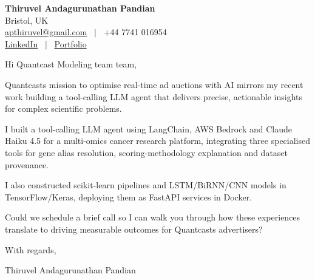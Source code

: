 \documentclass[11pt,a4paper]{article}
\begin{document}
\raggedright
\pagestyle{empty}

\begin{center}
    {\LARGE \color{linkblue} \textbf{Thiruvel Andagurunathan Pandian}}\\[0.2cm]
    Bristol, UK \\
    \href{mailto:apthiruvel@gmail.com}{apthiruvel@gmail.com} \ $|$ \ +44 7741 016954 \\
\href{https://www.linkedin.com/in/thiruvel-a-p/}{LinkedIn} \ $|$ \ \href{https://thiruvel-ap.github.io/PersonalPortfolio/}{Portfolio}
\end{center}

\vspace{0.4cm}

\noindent
Hi Quantcast Modeling team team,

Quantcast\textquotesingle{}s mission to optimise real-time ad auctions with AI mirrors my recent work building a tool-calling LLM agent that delivers precise, actionable insights for complex scientific problems.

I built a tool-calling LLM agent using LangChain, AWS Bedrock and Claude Haiku 4.5 for a multi-omics cancer research platform, integrating three specialised tools for gene alias resolution, scoring-methodology explanation and dataset provenance.

I also constructed scikit-learn pipelines and LSTM/BiRNN/CNN models in TensorFlow/Keras, deploying them as FastAPI services in Docker.

Could we schedule a brief call so I can walk you through how these experiences translate to driving measurable outcomes for Quantcast\textquotesingle{}s advertisers?

\vspace{0.5cm}

With regards,

Thiruvel Andagurunathan Pandian
\end{document}
